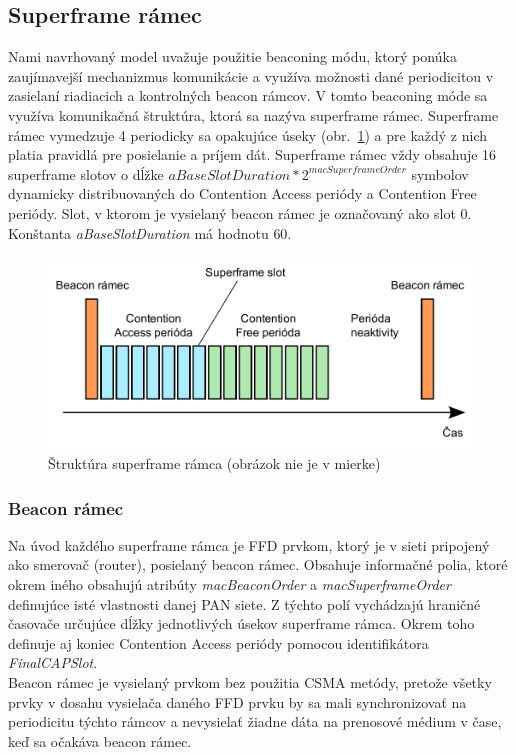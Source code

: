 \subsection{Superframe rámec}
\indent\indent Nami navrhovaný model uvažuje použitie beaconing módu, ktorý ponúka zaujímavejší mechanizmus komunikácie a využíva možnosti dané periodicitou v zasielaní riadiacich a kontrolných beacon rámcov. V tomto beaconing móde sa využíva komunikačná štruktúra, ktorá sa nazýva superframe rámec. Superframe rámec vymedzuje 4 periodicky sa opakujúce úseky (obr.~\ref{fig:superframe}) a pre každý z nich platia pravidlá pre posielanie a príjem dát. Superframe rámec vždy obsahuje 16 superframe slotov o dĺžke $aBaseSlotDuration * 2^{macSuperframeOrder}$ symbolov dynamicky distribuovaných do Contention Access periódy a Contention Free periódy. Slot, v ktorom je vysielaný beacon rámec je označovaný ako slot 0. Konštanta \textit{aBaseSlotDuration} má hodnotu $60$.\\
\begin{figure}[htbp]
\begin{center}
\includegraphics[width=140mm]{figures/superframe}
\caption{Štruktúra superframe rámca (obrázok nie je v mierke)}
\label{fig:superframe}
\end{center}
\end{figure}
\subsubsection{Beacon rámec}
\indent\indent Na úvod každého superframe rámca je FFD prvkom, ktorý je v sieti pripojený ako smerovač (router), posielaný beacon rámec. Obsahuje informačné polia, ktoré okrem iného obsahujú atribúty \textit{macBeaconOrder} a \textit{macSuperframeOrder} definujúce isté vlastnosti danej PAN siete. Z týchto polí vychádzajú hraničné časovače určujúce dĺžky jednotlivých úsekov superframe rámca. Okrem toho definuje aj koniec Contention Access periódy pomocou identifikátora \textit{FinalCAPSlot}.\\
\indent Beacon rámec je vysielaný prvkom bez použitia CSMA metódy, pretože všetky prvky v dosahu vysielača daného FFD prvku by sa mali synchronizovať na periodicitu týchto rámcov a nevysielať žiadne dáta na prenosové médium v čase, keď sa očakáva beacon rámec.\\
